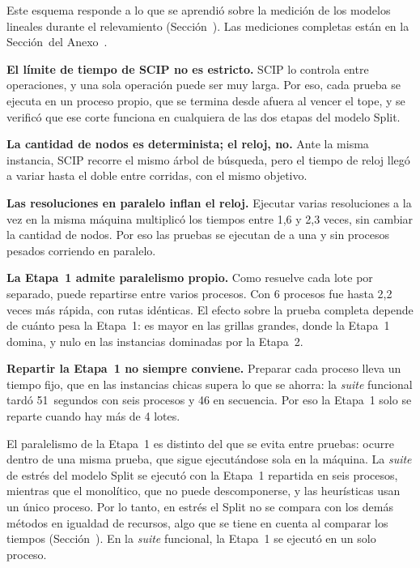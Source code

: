 Este esquema responde a lo que se aprendió sobre la medición de los modelos
lineales durante el relevamiento (Sección~). Las
mediciones completas están en la Sección~ del
Anexo~.
\startitemize
	\item {\bf El límite de tiempo de SCIP no es estricto.} SCIP lo controla
	entre operaciones, y una sola operación puede ser muy larga. Por eso, cada prueba se ejecuta en un proceso
	propio, que se termina desde afuera al vencer el tope, y se verificó que
	ese corte funciona en cualquiera de las dos etapas del modelo Split.
	\item {\bf La cantidad de nodos es determinista; el reloj, no.} Ante la
	misma instancia, SCIP recorre el mismo árbol de búsqueda, pero el tiempo
	de reloj llegó a variar hasta el doble entre corridas, con el mismo
	objetivo.
	\item {\bf Las resoluciones en paralelo inflan el reloj.} Ejecutar
	varias resoluciones a la vez en la misma máquina multiplicó los tiempos
	entre 1,6 y 2,3 veces, sin cambiar la cantidad de nodos. Por eso las
	pruebas se ejecutan de a una y sin procesos pesados corriendo en paralelo.
	\item {\bf La Etapa~1 admite paralelismo propio.} Como resuelve cada
	lote por separado, puede repartirse entre varios procesos. Con 6
	procesos fue hasta 2,2 veces más rápida, con rutas idénticas. El efecto
	sobre la prueba completa depende de cuánto pesa la Etapa~1: es mayor en
	las grillas grandes, donde la Etapa~1 domina, y nulo en las instancias
	dominadas por la Etapa~2.
	\item {\bf Repartir la Etapa~1 no siempre conviene.} Preparar cada
	proceso lleva un tiempo fijo, que en las instancias chicas supera lo que se
	ahorra: la {\em suite} funcional tardó 51~segundos con seis procesos y 46 en
	secuencia. Por eso la Etapa~1 solo se reparte cuando hay más de
	4 lotes.
\stopitemize

El paralelismo de la Etapa~1 es distinto del que se evita entre pruebas:
ocurre dentro de una misma prueba, que sigue ejecutándose sola en la
máquina. La {\em suite} de estrés del modelo Split se ejecutó con la Etapa~1
repartida en seis procesos, mientras que el monolítico, que no puede
descomponerse, y las heurísticas usan un único proceso. Por lo tanto, en
estrés el Split no se compara con los demás métodos en igualdad de recursos,
algo que se tiene en cuenta al comparar los tiempos
(Sección~). En la {\em suite} funcional, la
Etapa~1 se ejecutó en un solo proceso.

